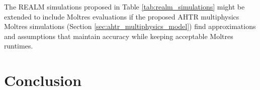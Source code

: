 The REALM simulations proposed in Table \ref{tab:realm_simulations} might be 
extended to include Moltres evaluations if the proposed \gls{AHTR} multiphysics
Moltres simulations (Section \ref{sec:ahtr_multiphysics_model}) find approximations 
and assumptions that maintain accuracy while keeping acceptable Moltres runtimes.


\section{Conclusion}
